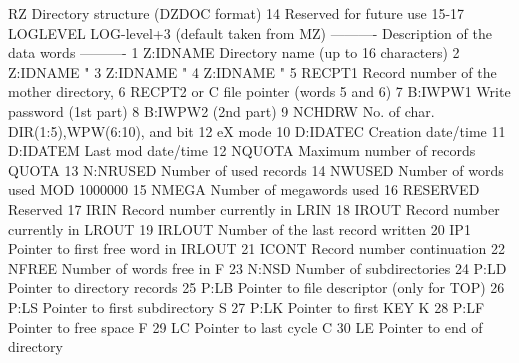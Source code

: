 \begin{XMPt}{RZ Directory structure (DZDOC format)}
 14                 Reserved for future use
 15-17     LOGLEVEL LOG-level+3  (default taken from MZ)                     
              ---------- Description of the data words   ----------
 1         Z:IDNAME Directory name (up to 16 characters)                        
 2         Z:IDNAME "                                                           
 3         Z:IDNAME "                                                           
 4         Z:IDNAME "                                                           
 5         RECPT1   Record number of the mother directory,                      
 6         RECPT2   or C file pointer (words 5 and 6)                           
 7         B:IWPW1  Write password (1st part)                                   
 8         B:IWPW2  (2nd part)                                                  
 9         NCHDRW   No. of char. DIR(1:5),WPW(6:10), and bit 12 eX mode         
 10        D:IDATEC Creation date/time                                          
 11        D:IDATEM Last mod date/time                                          
 12        NQUOTA   Maximum number of records QUOTA                             
 13        N:NRUSED Number of used records                                      
 14        NWUSED   Number of words used MOD 1000000                            
 15        NMEGA    Number of megawords used                                    
 16        RESERVED Reserved                                                    
 17        IRIN     Record number currently in LRIN                             
 18        IROUT    Record number currently in LROUT                            
 19        IRLOUT   Number of the last record written                           
 20        IP1      Pointer to first free word in IRLOUT                        
 21        ICONT    Record number continuation                                  
 22        NFREE    Number of words free in F                                   
 23        N:NSD    Number of subdirectories                                    
 24        P:LD     Pointer to directory records                                
 25        P:LB     Pointer to file descriptor (only for TOP)                   
 26        P:LS     Pointer to first subdirectory S                             
 27        P:LK     Pointer to first KEY K                                      
 28        P:LF     Pointer to free space F                                     
 29        LC       Pointer to last cycle C                                     
 30        LE       Pointer to end of directory                                 

\end{XMPt}

